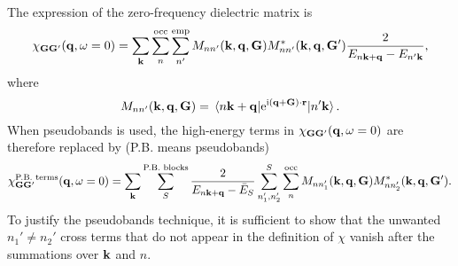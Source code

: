 \documentclass[hyperref, a4paper]{article}
\newcommand*{\ii}{\mathrm{i}}
\newcommand*{\ee}{\mathrm{e}}
\begin{document}
The expression of the zero-frequency dielectric matrix is 
\begin{equation}
    \chi_{\vb{G} \vb{G}'}(\vb{q}, \omega = 0)
    = \sum_{\vb{k}} \sum_{n}^{\text{occ}} \sum_{n'}^{\text{emp}} 
    M_{n n'} (\vb{k}, \vb{q}, \vb{G}) M^*_{nn'} (\vb{k}, \vb{q}, \vb{G}') 
    \frac{
        2
    }{
        E_{n \vb{k} + \vb{q}} - E_{n' \vb{k}} 
    },
\end{equation}
where 
\begin{equation}
    M_{nn'}(\vb{k}, \vb{q}, \vb{G}) = \mel*{n \vb{k} + \vb{q}}{\ee^{\ii (\vb{q} + \vb{G}) \cdot \vb{r}}}{n' \vb{k}}.
\end{equation}
When pseudobands is used,
the high-energy terms in $\chi_{\vb{G} \vb{G}'}(\vb{q}, \omega = 0)$ are therefore replaced by  
(P.B. means pseudobands)
\begin{equation}
    \chi^{\text{P.B. terms}}_{\vb{G} \vb{G}'}(\vb{q}, \omega = 0)
    = \sum_{\vb{k}}  \sum_{S}^{\text{P.B. blocks}} \frac{
        2
    }{
        E_{n \vb{k} + \vb{q}} - \bar{E}_S 
    } 
    \sum_{n_1', n_2'}^{S} \sum_{n}^{\text{occ}}
    M_{n n'_1} (\vb{k}, \vb{q}, \vb{G}) M^*_{nn'_2} (\vb{k}, \vb{q}, \vb{G}') .
    \label{eq:chi-pseudobands}
\end{equation}
To justify the pseudobands technique, 
it is sufficient to show that the unwanted $n_1' \neq n_2'$ cross terms 
that do not appear in the definition of $\chi$ vanish after the summations over $\vb{k}$ and $n$.
\end{document}
